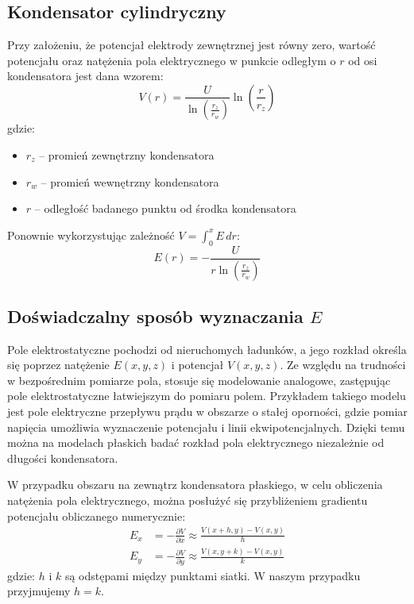 \documentclass{fizykalab}
\begin{document}
\subsection{Kondensator cylindryczny}

Przy założeniu, że potencjał elektrody zewnętrznej jest równy zero, wartość potencjału oraz natężenia pola elektrycznego w punkcie odległym o $r$ od osi kondensatora jest dana wzorem:
\begin{equation}
V(r) = \frac{U}{\ln\left(\frac{r_z}{r_w}\right)} \ln\left(\frac{r}{r_z}\right)
\end{equation}
gdzie:
\begin{itemize}
\item $r_z$ -- promień zewnętrzny kondensatora
\item $r_w$ -- promień wewnętrzny kondensatora
\item $r$ -- odległość badanego punktu od środka kondensatora
\end{itemize}

Ponownie wykorzystując zależność $V = \int_{0}^{x} E \, dr$:
\begin{equation}
E(r) = -\frac{U}{r \ln\left(\frac{r_z}{r_w}\right)}
\end{equation}

\subsection{Doświadczalny sposób wyznaczania $E$}

Pole elektrostatyczne pochodzi od nieruchomych ładunków, a jego rozkład określa się poprzez natężenie $E(x,y,z)$ i potencjał $V(x,y,z)$. Ze względu na trudności w bezpośrednim pomiarze pola, stosuje się modelowanie analogowe, zastępując pole elektrostatyczne łatwiejszym do pomiaru polem. Przykładem takiego modelu jest pole elektryczne przepływu prądu w obszarze o stałej oporności, gdzie pomiar napięcia umożliwia wyznaczenie potencjału i linii ekwipotencjalnych. Dzięki temu można na modelach płaskich badać rozkład pola elektrycznego niezależnie od długości kondensatora.

W przypadku obszaru na zewnątrz kondensatora płaskiego, w celu obliczenia natężenia pola elektrycznego, można posłużyć się przybliżeniem gradientu potencjału obliczanego numerycznie:
\begin{equation}
\begin{aligned}
E_x &= -\frac{\partial V}{\partial x} \approx \frac{V(x+h, y) - V(x, y)}{h} \\
E_y &= -\frac{\partial V}{\partial y} \approx \frac{V(x, y+k) - V(x, y)}{k}
\end{aligned}
\end{equation}
gdzie: $h$ i $k$ są odstępami między punktami siatki. W naszym przypadku przyjmujemy $h = k$.
\end{document}
